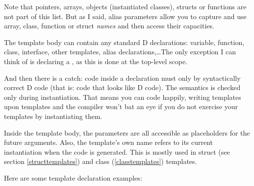 Note that pointers, arrays, objects (instantiated classes), structs or functions are not part of this list. But as I said, alias parameters allow you to capture and use array, class, function or struct \emph{names} and then access their capacities.

The template body can contain any standard D declarations: variable, function, class, interface, other templates, alias declarations,\ldots The only exception I can think of is declaring a , as this is done at the top-level scope. 

 {And then there is a catch: code inside a  declaration must only by syntactically correct D code (that is: code that looks like D code). The semantics is checked only during instantiation. That means you can code happily, writing templates upon templates and the compiler won't bat an eye if you do not exercise your templates by instantiating them.}

Inside the template body, the parameters are all accessible as placeholders for the future arguments. Also, the template's own name refers to its current instantiation when the code is generated. This is mostly used in struct (see section \ref{structtemplates}) and class (\ref{classtemplates}) templates.

Here are some template declaration examples:\label{templatedeclarationexamples}

